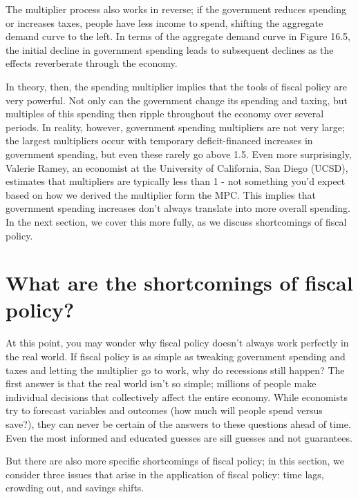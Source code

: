\documentclass[11pt]{article} %
\begin{document}
The multiplier process also works in reverse; if the government reduces spending or increases taxes, people have less income to spend, shifting the aggregate demand curve to the left. In terms of the aggregate demand curve in Figure 16.5, the initial decline in government spending leads to subsequent declines as the effects reverberate through the economy.

In theory, then, the spending multiplier implies that the tools of fiscal policy are very powerful. Not only can the government change its spending and taxing, but multiples of this spending then ripple throughout the economy over several periods. In reality, however, government spending multipliers are not very large; the largest multipliers occur with temporary deficit-financed increases in government spending, but even these rarely go above 1.5. Even more surprisingly, Valerie Ramey, an economist at the University of California, San Diego (UCSD), estimates that multipliers are typically less than 1 - not something you'd expect based on how we derived the multiplier form the MPC. This implies that government spending increases don't always translate into more overall spending. In the next section, we cover this more fully, as we discuss shortcomings of fiscal policy.

\section*{\textbf{What are the shortcomings of fiscal policy?}}
At this point, you may wonder why fiscal policy doesn't always work perfectly in the real world. If fiscal policy is as simple as tweaking government spending and taxes and letting the multiplier go to work, why do recessions still happen? The first answer is that the real world isn't so simple; millions of people make individual decisions that collectively affect the entire economy. While economists try to forecast variables and outcomes (how much will people spend versus save?), they can never be certain of the answers to these questions ahead of time. Even the most informed and educated guesses are sill guesses and not guarantees.

But there are also more specific shortcomings of fiscal policy; in this section, we consider three issues that arise in the application of fiscal policy: time lags, crowding out, and savings shifts.
\end{document}
